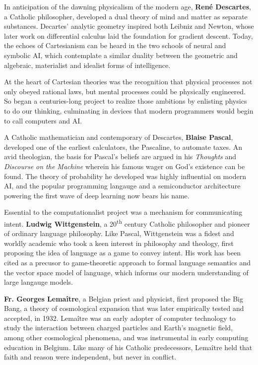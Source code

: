 \documentclass[sigplan,nonacm]{acmart}\settopmatter{printfolios=false,printccs=false,printacmref=false}
\begin{document}
  In anticipation of the dawning physicalism of the modern age, \textbf{Ren\'e Descartes}, a Catholic philosopher, developed a dual theory of mind and matter as separate substances. Decartes' analytic geometry inspired both Leibniz and Newton, whose later work on differential calculus laid the foundation for gradient descent. Today, the echoes of Cartesianism can be heard in the two schools of neural and symbolic AI, which contemplate a similar duality between the geometric and algebraic, materialist and idealist forms of intelligence.

  At the heart of Cartesian theories was the recognition that physical processes not only obeyed rational laws, but mental processes could be physically engineered. So began a centuries-long project to realize those ambitions by enlisting physics to do our thinking, culminating in devices that modern programmers would begin to call computers and AI.

  A Catholic mathematician and contemporary of Descartes, \textbf{Blaise Pascal}, developed one of the earliest calculators, the Pascaline, to automate taxes. An avid theologian, the basis for Pascal's beliefs are argued in his \textit{Thoughts} and \textit{Discourse on the Machine} wherein his famous wager on God's existence can be found. The theory of probability he developed was highly influential on modern AI, and the popular programming langauge and a semiconductor architecture powering the first wave of deep learning now bears his name.

  Essential to the computationalist project was a mechanism for communicating intent. \textbf{Ludwig Wittgenstein}, a 20\textsuperscript{th} century Catholic philosopher and pioneer of ordinary language philosophy. Like Pascal, Wittgenstein was a fidest and worldly academic who took a keen interest in philosophy and theology, first proposing the idea of language as a game to convey intent. His work has been cited as a precusor to game-theoretic approach to formal language semantics and the vector space model of language, which informs our modern understanding of large langauge models.

  \textbf{Fr. Georges Lema\^itre}, a Belgian priest and physicist, first proposed the Big Bang, a theory of cosmological expansion that was later empirically tested and accepted, in 1932. Lema\^itre was an early adopter of computer technology to study the interaction between charged particles and Earth's magnetic field, among other cosmological phenomena, and was instrumental in early computing education in Belgium. Like many of his Catholic predecessors, Lema\^itre held that faith and reason were independent, but never in conflict.
\end{document}

